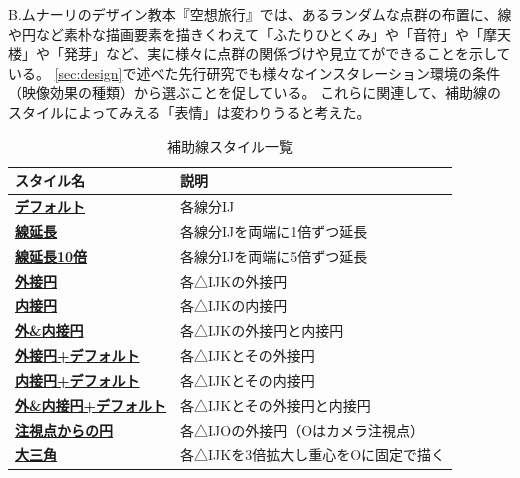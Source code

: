 B.ムナーリのデザイン教本『空想旅行』\cite{munari:1992}では、あるランダムな点群の布置に、線や円など素朴な描画要素を描きくわえて「ふたりひとくみ」や「音符」や「摩天楼」や「発芽」など、実に様々に点群の関係づけや見立てができることを示している。
\ref{sec:design}で述べた先行研究\cite{konno_et_al:2016}でも様々なインスタレーション環境の条件（映像効果の種類）から選ぶことを促している。
これらに関連して、補助線のスタイルによってみえる「表情」は変わりうると考えた。
\begin{table}[htbp]
  \begin{center}
  \caption{補助線スタイル一覧}                %
  \label{table:hojosen_type}
  \begin{tabular}[hbt]{l l}
  \hline
  \bf スタイル名 & \bf 説明 \\
  \hline
  \href{https://takahitohoriuchi.github.io/hj-playground_gallery/style_a.html}{\textbf{デフォルト}} & 各線分IJ \\
  \href{https://takahitohoriuchi.github.io/hj-playground_gallery/style_b.html}{\textbf{線延長}} & 各線分IJを両端に1倍ずつ延長 \\
  \href{https://takahitohoriuchi.github.io/hj-playground_gallery/style_c.html}{\textbf{線延長10倍}} & 各線分IJを両端に5倍ずつ延長\\
  \href{https://takahitohoriuchi.github.io/hj-playground_gallery/style_d.html}{\textbf{外接円}} & 各△IJKの外接円 \\
  \href{https://takahitohoriuchi.github.io/hj-playground_gallery/style_e.html}{\textbf{内接円}} & 各△IJKの内接円 \\
  \href{https://takahitohoriuchi.github.io/hj-playground_gallery/style_f.html}{\textbf{外\&内接円}} & 各△IJKの外接円と内接円 \\
  \href{https://takahitohoriuchi.github.io/hj-playground_gallery/style_g.html}{\textbf{外接円+デフォルト}} & 各△IJKとその外接円 \\
  \href{https://takahitohoriuchi.github.io/hj-playground_gallery/style_h.html}{\textbf{内接円+デフォルト}} & 各△IJKとその内接円 \\
  \href{https://takahitohoriuchi.github.io/hj-playground_gallery/style_i.html}{\textbf{外\&内接円+デフォルト}} & 各△IJKとその外接円と内接円 \\
  \href{https://takahitohoriuchi.github.io/hj-playground_gallery/style_j.html}{\textbf{注視点からの円}} & 各△IJOの外接円（Oはカメラ注視点） \\    
  \href{https://takahitohoriuchi.github.io/hj-playground_gallery/style_k.html}{\textbf{大三角}} & 各△IJKを3倍拡大し重心をOに固定で描く \\    
  \hline
  \end{tabular}
  \end{center}
\end{table}

